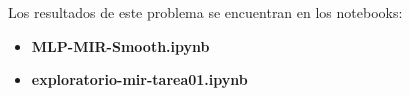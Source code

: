 

Los resultados de este problema se encuentran en los notebooks:

\begin{itemize}
    \item \textbf{MLP-MIR-Smooth.ipynb}
    \item \textbf{exploratorio-mir-tarea01.ipynb}
\end{itemize}

\clearpage